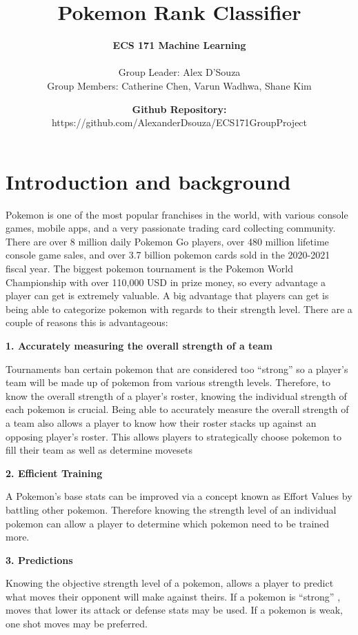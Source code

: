 \documentclass[conference]{IEEEtran}
\title{\textbf{Pokemon Rank Classifier}}
\author{\textbf{ECS 171 Machine Learning} \\\\Group Leader: Alex D'Souza \\ Group Members: Catherine Chen, Varun Wadhwa, Shane Kim}
\date{\textbf{Github Repository: }https://github.com/AlexanderDsouza/ECS171GroupProject}
\begin{document}
    \maketitle
\chapter{Introduction and background}
Pokemon is one of the most popular franchises in the world, with various console games, mobile apps, and a very passionate trading card collecting community. There are over 8 million daily Pokemon Go players, over 480 million lifetime console game sales, and over 3.7 billion pokemon cards sold in the 2020-2021 fiscal year. The biggest pokemon tournament is the Pokemon World Championship with over 110,000 USD in prize money, so every advantage a player can get is extremely valuable. A big advantage that players can get is being able to categorize pokemon with regards to their strength level. There are a couple of reasons this is advantageous: 

\begin{center}
\textbf{1. Accurately measuring the overall strength of a team}
\end{center}
Tournaments ban certain pokemon that are considered too “strong” so a player’s team will be made up of pokemon from various strength levels. Therefore, to know the overall strength of a player’s roster, knowing the individual strength of each pokemon is crucial. Being able to accurately measure the overall strength of a team also allows a player to know how their roster stacks up against an opposing player’s roster. This allows players to strategically choose pokemon to fill their team as well as determine movesets 

\begin{center}
\textbf{2. Efficient Training}
\end{center}
A Pokemon’s base stats can be improved via a concept known as Effort Values by battling other pokemon. Therefore knowing the strength level of an individual pokemon can allow a player to determine which pokemon need to be trained more.\\

\begin{center}
\textbf{3. Predictions}
\end{center}
Knowing the objective strength level of a pokemon, allows a player to predict what moves their opponent will make against theirs. If a pokemon is “strong” , moves that lower its attack or defense stats may be used. If a pokemon is weak, one shot moves may be preferred.\\ 
\end{document}
